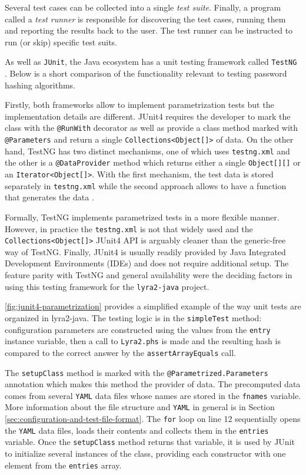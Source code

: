 Several test cases can be collected into a single \emph{test suite}. Finally, a program called a \emph{test runner} is responsible for discovering the test cases, running them and reporting the results back to the user. The test runner can be instructed to run (or skip) specific test suits.

As well as \texttt{JUnit}, the Java ecosystem has a unit testing framework called \texttt{TestNG} \cite{testng:2017:home}. Below is a short comparison of the functionality relevant to testing password hashing algorithms.

Firstly, both frameworks allow to implement parametrization tests but the implementation details are different. JUnit4 requires the developer to mark the class with the \texttt{@RunWith} decorator as well as provide a class method marked with \texttt{@Parameters} and return a single \texttt{Collections<Object[]>} of data. On the other hand, TestNG has two distinct mechanisms, one of which uses \texttt{testng.xml} and the other is a \texttt{@DataProvider} method which returns either a single \texttt{Object[][]} or an \texttt{Iterator<Object[]>}. With the first mechanism, the test data is stored separately in \texttt{testng.xml} while the second approach allows to have a function that generates the data \cite{testng:2017:parametrized-testing}.

Formally, TestNG implements parametrized tests in a more flexible manner. However, in practice the \texttt{testng.xml} is not that widely used and the \texttt{Collections<Object[]>} JUnit4 API is arguably cleaner than the generic-free way of TestNG. Finally, JUnit4 is usually readily provided by Java Integrated Development Environments (IDEs) and does not require additional setup. The feature parity with TestNG and general availability were the deciding factors in using this testing framework for the \texttt{lyra2-java} project.

\autoref{fig:junit4-parametrization} provides a simplified example of the way unit tests are organized in lyra2-java. The testing logic is in the \texttt{simpleTest} method: configuration parameters are constructed using the values from the \texttt{entry} instance variable, then a call to \texttt{Lyra2.phs} is made and the resulting hash is compared to the correct answer by the \texttt{assertArrayEquals} call.

The \texttt{setupClass} method is marked with the \texttt{@Parametrized.Parameters} annotation which makes this method the provider of data. The precomputed data comes from several \texttt{YAML} data files whose names are stored in the \texttt{fnames} variable. More information about the file structure and \texttt{YAML} in general is in Section \ref{sec:configuration-and-test-file-format}. The \texttt{for} loop on line 12 sequentially opens the \texttt{YAML} data files, loads their contents and collects them in the \texttt{entries} variable. Once the \texttt{setupClass} method returns that variable, it is used by JUnit to initialize several instances of the class, providing each constructor with one element from the \texttt{entries} array.

